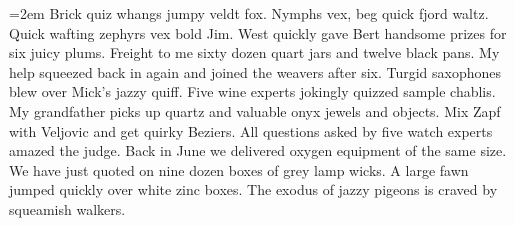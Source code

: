\texttoks={\emergencystretch2em Brick quiz whangs jumpy veldt fox.
Nymphs vex, beg quick fjord waltz.
Quick wafting zephyrs vex bold Jim.
West quickly gave Bert handsome prizes for six juicy plums.
Freight to me sixty dozen quart jars and twelve black pans.
My help squeezed back in again and joined the weavers after six.
Turgid saxophones blew over Mick's jazzy quiff.
Five wine experts jokingly quizzed sample chablis.
My grandfather picks up quartz and valuable onyx jewels and objects.
Mix Zapf with Veljovic and get quirky Beziers.
All questions asked by five watch experts amazed the judge.
Back in June we delivered oxygen equipment of the same size.
We have just quoted on nine dozen boxes of grey lamp wicks.
A large fawn jumped quickly over white zinc boxes.
The exodus of jazzy pigeons is craved by squeamish walkers.}

\def\freqabc{zjqx%
       kkvv%
       bbbbppppyyyywwwwgggg%
       mmmmmmffffffccccccuuuuuu%
       lllllllldddddddd%
       hhhhhhhhhhhhrrrrrrrrrrrrssssssssssss%
       ooooooooooooooiiiiiiiiiiiiiinnnnnnnnnnnnnn%
       aaaaaaaaaaaaaaaatttttttttttttttttt%
       eeeeeeeeeeeeeeeeeeeeeeee}%

\def\textbox#1#2#3{#1%
\setbox0=\vtop{%
\hbadness10000\hsize\sampletextwd\the\texttoks}%
\setbox1=\vsplit0 to #2\baselineskip
\vtop{\hsize\sampletextwd\centerline{\strut#1[#3]}\smallskip\unvbox1\relax%
1\hfill2\hfill3\hfill4\hfill5\hfill6\hfill7\hfill8\hfill9\hfill0\hfill\&\null\par%
}}

\def\setupmargnote{%
\tinytinytype \setleading \baselineskip=\leading \vskip\baselineskip}

\def\lineoftwo#1#2#3#4#5#6{%
\begingroup
\font\typeone=#3 at #1%
\typeone\setleading \calcxaratio{\typeone}
 \baselineskip=\leading
 \mainleading=\leading
\font\typetwo=#5 at #1%
\line{%
\llap{\vtop{\setupmargnote%
   \halign{\hfill##\cr#1\cr
   \prettypt{\the\mainleading}\cr
   \typefact{#3}\cr
   0.\the\xascrnum\cr}}\enskip}\hss%
\textbox{\typeone}{#2}{#4}%
\hskip\gutter
\typetwo \setleading \calcxaratio{\typetwo}
\textbox{\typetwo}{#2}{#6}%
\hss
\rlap{\enskip\vtop{\setupmargnote%
			\halign{##\hfil\cr#1\cr
   \prettypt{\the\mainleading}\cr
   \typefact{#5}\cr
   0.\the\xascrnum\cr}}}%
}\endgroup}


